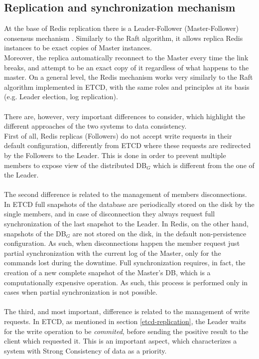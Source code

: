 \pagebreak

\subsection{Replication and synchronization mechanism}
At the base of Redis replication there is a Leader-Follower (Master-Follower) consensus mechanism \cite{site:redis-replication}. Similarly to the Raft algorithm, it allows replica Redis instances to be exact copies of Master instances. \\
Moreover, the replica automatically reconnect to the Master every time the link breaks, and attempt to be an exact copy of it regardless of what happens to the master. On a general level, the Redis mechanism works very similarly to the Raft algorithm implemented in ETCD, with the same roles and principles at its basis (e.g. Leader election, log replication). \\ \\
There are, however, very important differences to consider, which highlight the different approaches of the two systems to data consistency. \\
First of all, Redis replicas (Followers) do not accept write requests in their default configuration, differently from ETCD where these requests are redirected by the Followers to the Leader. This is done in order to prevent multiple members to expose view of the distributed DB$_G$ which is different from the one of the Leader. \\ \\
The second difference is related to the management of members disconnections. In ETCD full snapshots of the database are periodically stored on the disk by the single members, and in case of disconnection they always request full synchronization of the last snapshot to the Leader. In Redis, on the other hand, snapshots of the DB$_G$ are not stored on the disk, in the default non-persistence configuration. As such, when disconnections happen the member request just partial synchronization with the current log of the Master, only for the commands lost during the downtime. Full synchronization requires, in fact, the creation of a new complete snapshot of the Master's DB, which is a computationally expensive operation. As such, this process is performed only in cases when partial synchronization is not possible. \\ \\
The third, and most important, difference is related to the management of write requests. In ETCD, as mentioned in section \ref{etcd-replication}, the Leader waits for the write operation to be \textit{commited}, before sending the positive result to the client which requested it. This is an important aspect, which characterizes a system with Strong Consistency of data as a priority. \\
